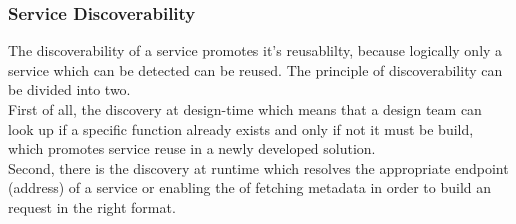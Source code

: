 \documentclass[12pt]{article}
\begin{document}
\subsubsection{Service Discoverability}
\label{sec:disc}
The discoverability of a service promotes it's reusablilty, because logically only a service which can be detected can be reused. The principle of discoverability can be divided into two. \\ First of all, the discovery at design-time which means that a design team can look up if a specific function already exists and only if not it must be build, which promotes service reuse in a newly developed solution. \\ Second, there is the discovery at runtime which resolves the appropriate endpoint (address) of a service or enabling the of fetching metadata in order to build an request in the right format. \cite[page 89]{te}
\end{document}
